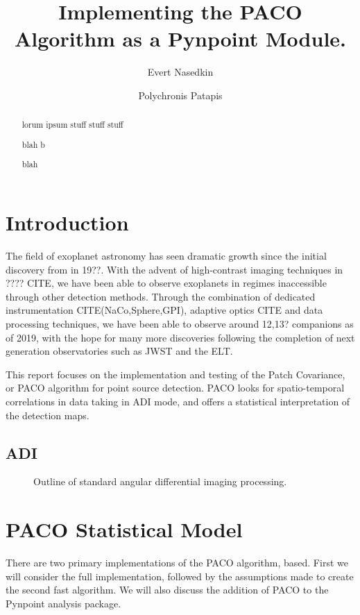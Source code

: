\documentclass[twocolumn,fleqn]{aastex62}
\begin{document}
	
	
	\title{Implementing the PACO Algorithm as a Pynpoint Module.}
	
	
	
	\author{Evert Nasedkin}
	\author{Polychronis Patapis}

\setlength{\mathindent}{10pt}
\begin{abstract}
lorum ipsum stuff stuff stuff

blah
b

blah
\end{abstract}

\section{Introduction}
The field of exoplanet astronomy has seen dramatic growth since the initial discovery from \cite{ref:quel} in 19??. 
With the advent of high-contrast imaging techniques in ???? CITE, we have been able to observe exoplanets in regimes inaccessible through other detection methods.
Through the combination of dedicated instrumentation CITE(NaCo,Sphere,GPI), adaptive optics CITE and data processing techniques, we have been able to observe around 12,13? companions as of 2019, with the hope for many more discoveries following the completion of next generation observatories such as JWST and the ELT. 

This report focuses on the implementation and testing of the Patch Covariance, or PACO algorithm for point source detection. PACO looks for spatio-temporal correlations in data taking in ADI mode, and offers a statistical interpretation of the detection maps.
\subsection{ADI}
\begin{figure}[h]
	\caption{\label{fig:adi} Outline of standard angular differential imaging processing.}
\end{figure}
\section{PACO Statistical Model}
There are two primary implementations of the PACO algorithm, based.
First we will consider the full implementation, followed by the assumptions made to create the second fast algorithm.
We will also discuss the addition of PACO to the Pynpoint analysis package.
\end{document}
